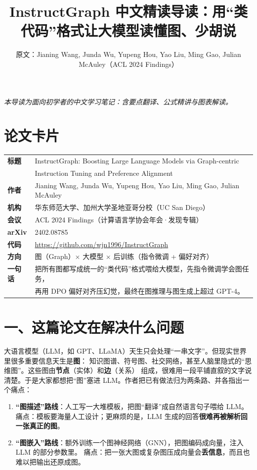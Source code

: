\documentclass[11pt,UTF8,fontset=fandol]{ctexart}
\title{InstructGraph 中文精读导读：用“类代码”格式让大模型读懂图、少胡说}
\author{原文：Jianing Wang, Junda Wu, Yupeng Hou, Yao Liu, Ming Gao, Julian McAuley（ACL 2024 Findings）}
\date{}
\begin{document}
\maketitle
\begin{center}\small\textit{本导读为面向初学者的中文学习笔记：含要点翻译、公式精讲与图表解读。}\end{center}

\section*{论文卡片}
\begin{center}
\begin{tabular}{@{}ll@{}}
\toprule
\textbf{标题} & InstructGraph: Boosting Large Language Models via Graph-centric \\
            & Instruction Tuning and Preference Alignment \\
\textbf{作者} & Jianing Wang, Junda Wu, Yupeng Hou, Yao Liu, Ming Gao, Julian McAuley \\
\textbf{机构} & 华东师范大学、加州大学圣地亚哥分校（UC San Diego） \\
\textbf{会议} & ACL 2024 Findings（计算语言学协会年会·发现专辑） \\
\textbf{arXiv} & 2402.08785 \\
\textbf{代码} & \url{https://github.com/wjn1996/InstructGraph} \\
\textbf{方向} & 图（Graph）$\times$ 大模型 $\times$ 后训练（指令微调 + 偏好对齐） \\
\textbf{一句话} & 把所有图都写成统一的“类代码”格式喂给大模型，先指令微调学会图任务，\\
              & 再用 DPO 偏好对齐压幻觉，最终在图推理与图生成上超过 GPT-4。 \\
\bottomrule
\end{tabular}
\end{center}

\section{一、这篇论文在解决什么问题}

大语言模型（LLM，如 GPT、LLaMA）天生只会处理“一串文字”。但现实世界里很多重要信息天生是\textbf{图}：
知识图谱、符号图、社交网络，甚至人脑里隐式的“思维图”。这些图由\textbf{节点}（实体）和\textbf{边}（关系）
组成，很难用一段平铺直叙的文字说清楚。于是大家都想把“图”塞进 LLM。作者把已有做法归为两条路、并各指出一个痛点：

\begin{enumerate}[leftmargin=2em]
  \item \textbf{“图描述”路线}：人工写一大堆模板，把图“翻译”成自然语言句子喂给 LLM。
        痛点：模板要海量人工设计；更麻烦的是，LLM 生成的回答\textbf{很难再被解析回一张真正的图}。
  \item \textbf{“图嵌入”路线}：额外训练一个图神经网络（GNN），把图编码成向量，注入 LLM 的部分参数里。
        痛点：把一张大图或复杂图压成向量会\textbf{丢信息}，而且也难以把输出还原成图。
\end{enumerate}
\end{document}
